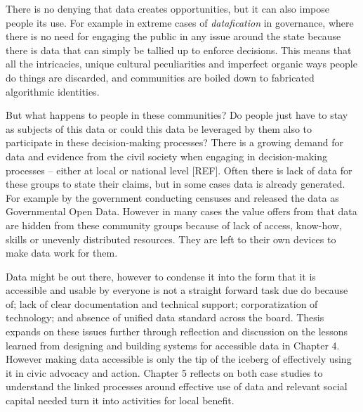 There is no denying that data creates opportunities, but it can also impose people its use. For example in extreme cases of \textit{datafication} in governance, where there is no need for engaging the public in any issue around the state because there is data that can simply be tallied up to enforce decisions. This means that all the intricacies, unique cultural peculiarities and imperfect organic ways people do things are discarded, and communities are boiled down to fabricated algorithmic identities.

But what happens to people in these communities? Do people just have to stay as subjects of this data or could this data be leveraged by them also to participate in these decision-making processes? There is a growing demand for data and evidence from the civil society when engaging in decision-making processes -- either at local or national level [REF]. Often there is lack of data for these groups to state their claims, but in some cases data is already generated. For example by the government conducting censuses and released the data as Governmental Open Data. However in many cases the value offers from that data are hidden from these community groups because of lack of access, know-how, skills or unevenly distributed resources. They are left to their own devices to make data work for them.


Data might be out there, however to condense it into the form that it is accessible and usable by everyone is not a straight forward task due do because of; lack of clear documentation and technical support; corporatization of technology; and absence of unified data standard across the board. Thesis expands on these issues further through reflection and discussion on the lessons learned from designing and building systems for accessible data in Chapter 4. However making data accessible is only the tip of the iceberg of effectively using it in civic advocacy and action. Chapter 5 reflects on both case studies to understand the linked processes around effective use of data and relevant social capital needed turn it into activities for local benefit. 

